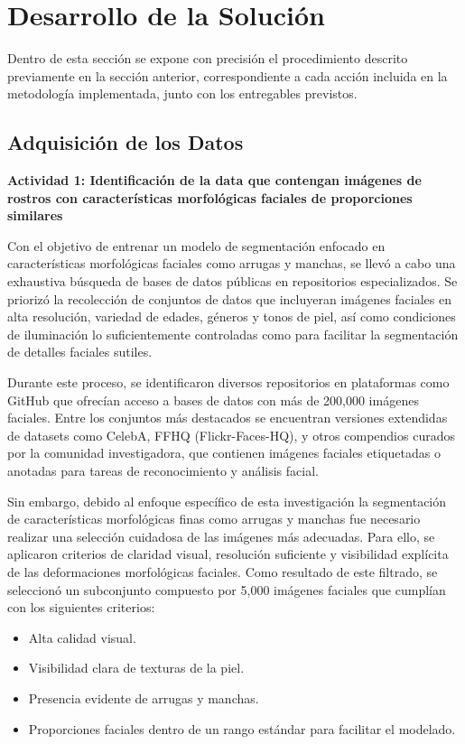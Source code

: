 \chapter{Desarrollo de la Solución}
Dentro de esta sección se expone con precisión el procedimiento descrito previamente en la sección anterior, correspondiente a cada acción incluida en la metodología implementada, junto con los entregables previstos.

\section{Adquisición de los Datos}

\textbf{Actividad 1: Identificación de la data que contengan imágenes de rostros con características morfológicas faciales de proporciones similares}
 
Con el objetivo de entrenar un modelo de segmentación enfocado en características morfológicas faciales como arrugas y manchas, se llevó a cabo una exhaustiva búsqueda de bases de datos públicas en repositorios especializados. Se priorizó la recolección de conjuntos de datos que incluyeran imágenes faciales en alta resolución, variedad de edades, géneros y tonos de piel, así como condiciones de iluminación lo suficientemente controladas como para facilitar la segmentación de detalles faciales sutiles.

Durante este proceso, se identificaron diversos repositorios en plataformas como GitHub que ofrecían acceso a bases de datos con más de 200,000 imágenes faciales. Entre los conjuntos más destacados se encuentran versiones extendidas de datasets como CelebA, FFHQ (Flickr-Faces-HQ), y otros compendios curados por la comunidad investigadora, que contienen imágenes faciales etiquetadas o anotadas para tareas de reconocimiento y análisis facial.

Sin embargo, debido al enfoque específico de esta investigación la segmentación de características morfológicas finas como arrugas y manchas fue necesario realizar una selección cuidadosa de las imágenes más adecuadas. Para ello, se aplicaron criterios de claridad visual, resolución suficiente y visibilidad explícita de las deformaciones morfológicas faciales. Como resultado de este filtrado, se seleccionó un subconjunto compuesto por 5,000 imágenes faciales que cumplían con los siguientes criterios:

\begin{itemize}
    \item Alta calidad visual.   
    \item Visibilidad clara de texturas de la piel.
    \item Presencia evidente de arrugas y manchas.
    \item Proporciones faciales dentro de un rango estándar para facilitar el modelado.
\end{itemize} 

